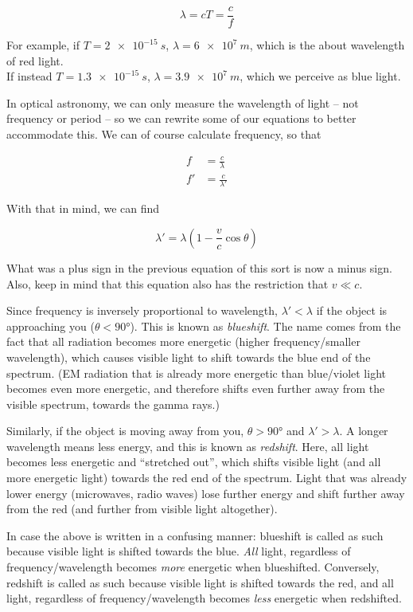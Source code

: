 \begin{equation}
\lambda = c T = \frac{c}{f}
\end{equation}

For example, if $T = \SI{2e-15}{s}$, $\lambda = \SI{6e7}{m}$, which is the about wavelength of red light.\\
If instead $T = \SI{1.3e-15}{s}$, $\lambda = \SI{3.9e7}{m}$, which we perceive as blue light.

In optical astronomy, we can only measure the wavelength of light -- not frequency or period -- so we can rewrite some of our equations to better accommodate this. We can of course calculate frequency, so that

\begin{align}
f  &= \frac{c}{\lambda}\\
f' &= \frac{c}{\lambda'}
\end{align}

With that in mind, we can find

\begin{equation}
\lambda' = \lambda(1 - \frac{v}{c} \cos \theta)
\end{equation}

What was a plus sign in the previous equation of this sort is now a minus sign. Also, keep in mind that this equation also has the restriction that $v \ll c$.

Since frequency is inversely proportional to wavelength, $\lambda' < \lambda$ if the object is approaching you ($\theta < \ang{90}$). This is known as \emph{blueshift}. The name comes from the fact that all radiation becomes more energetic (higher frequency/smaller wavelength), which causes visible light to shift towards the blue end of the spectrum. (EM radiation that is already more energetic than blue/violet light becomes even more energetic, and therefore shifts even further away from the visible spectrum, towards the gamma rays.)

Similarly, if the object is moving away from you, $\theta > \ang{90}$ and $\lambda' > \lambda$. A longer wavelength means less energy, and this is known as \emph{redshift}. Here, all light becomes less energetic and ``stretched out'', which shifts visible light (and all more energetic light) towards the red end of the spectrum. Light that was already lower energy (microwaves, radio waves) lose further energy and shift further away from the red (and further from visible light altogether).

In case the above is written in a confusing manner: blueshift is called as such because visible light is shifted towards the blue. \emph{All} light, regardless of frequency/wavelength becomes \emph{more} energetic when blueshifted. Conversely, redshift is called as such because visible light is shifted towards the red, and all light, regardless of frequency/wavelength becomes \emph{less} energetic when redshifted.

